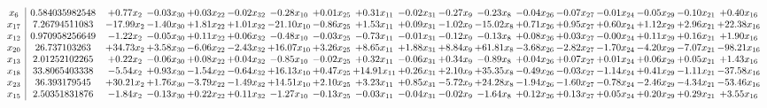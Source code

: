 \documentclass[9pt]{article}
\begin{document}
 \[\begin{array}{c| c c@{\hskip 2pt} c@{\hskip 2pt} c@{\hskip 2pt} c@{\hskip 2pt} c@{\hskip 2pt} c@{\hskip 2pt} c@{\hskip 2pt} c@{\hskip 2pt} c@{\hskip 2pt} c@{\hskip 2pt} c@{\hskip 2pt} c@{\hskip 2pt} c@{\hskip 2pt} c@{\hskip 2pt} c@{\hskip 2pt} c@{\hskip 2pt} }
 x_{6}   &  0.584035982548 & +  0.77 x_{2} & -0.03 x_{30} & +  0.03 x_{22} & -0.02 x_{32} & -0.28 x_{10} & +  0.01 x_{25} & +  0.31 x_{11} & -0.02 x_{31} & -0.27 x_{9} & -0.23 x_{8} & -0.04 x_{26} & -0.07 x_{27} & -0.01 x_{24} & -0.05 x_{29} & -0.10 x_{21} & +  0.40 x_{16}\\
 x_{17}   &  7.26794511083 & -17.99 x_{2} & -1.40 x_{30} & +  1.81 x_{22} & +  1.01 x_{32} & -21.10 x_{10} & -0.86 x_{25} & +  1.53 x_{11} & +  0.09 x_{31} & -1.02 x_{9} & -15.02 x_{8} & +  0.71 x_{26} & +  0.95 x_{27} & +  0.60 x_{24} & +  1.12 x_{29} & +  2.96 x_{21} & + 22.38 x_{16}\\
 x_{12}   &  0.970958256649 & -1.22 x_{2} & -0.05 x_{30} & +  0.11 x_{22} & +  0.06 x_{32} & -0.48 x_{10} & -0.03 x_{25} & -0.73 x_{11} & -0.01 x_{31} & -0.12 x_{9} & -0.13 x_{8} & +  0.08 x_{26} & +  0.03 x_{27} & -0.00 x_{24} & +  0.11 x_{29} & +  0.16 x_{21} & +  1.90 x_{16}\\
 x_{20}   &  26.737103263 & + 34.73 x_{2} & +  3.58 x_{30} & -6.06 x_{22} & -2.43 x_{32} & + 16.07 x_{10} & +  3.26 x_{25} & +  8.65 x_{11} & +  1.88 x_{31} & +  8.84 x_{9} & + 61.81 x_{8} & -3.68 x_{26} & -2.82 x_{27} & -1.70 x_{24} & -4.20 x_{29} & -7.07 x_{21} & -98.21 x_{16}\\
 x_{13}   &  2.01252102265 & +  0.22 x_{2} & -0.06 x_{30} & +  0.08 x_{22} & +  0.04 x_{32} & -0.85 x_{10} & -0.02 x_{25} & +  0.32 x_{11} & -0.06 x_{31} & +  0.34 x_{9} & -0.89 x_{8} & +  0.04 x_{26} & +  0.07 x_{27} & +  0.01 x_{24} & +  0.06 x_{29} & +  0.05 x_{21} & +  1.43 x_{16}\\
 x_{18}   &  33.8065403338 & -5.54 x_{2} & +  0.93 x_{30} & -1.54 x_{22} & -0.64 x_{32} & + 16.13 x_{10} & +  0.47 x_{25} & + 14.91 x_{11} & +  0.26 x_{31} & +  2.10 x_{9} & + 35.35 x_{8} & -0.49 x_{26} & -0.03 x_{27} & -1.14 x_{24} & +  0.41 x_{29} & -1.11 x_{21} & -37.58 x_{16}\\
 x_{23}   &  36.393179545 & + 30.21 x_{2} & +  1.76 x_{30} & -3.79 x_{22} & -1.49 x_{32} & + 14.51 x_{10} & +  2.10 x_{25} & +  3.23 x_{11} & +  0.85 x_{31} & -5.72 x_{9} & + 24.28 x_{8} & -1.94 x_{26} & -1.60 x_{27} & -0.78 x_{24} & -2.46 x_{29} & -4.34 x_{21} & -53.46 x_{16}\\
 x_{15}   &  2.50351831876 & -1.84 x_{2} & -0.13 x_{30} & +  0.22 x_{22} & +  0.11 x_{32} & -1.27 x_{10} & -0.13 x_{25} & -0.03 x_{11} & -0.04 x_{31} & -0.02 x_{9} & -1.64 x_{8} & +  0.12 x_{26} & +  0.13 x_{27} & +  0.05 x_{24} & +  0.20 x_{29} & +  0.29 x_{21} & +  3.55 x_{16}\\

\end{array}\]
\end{document}
